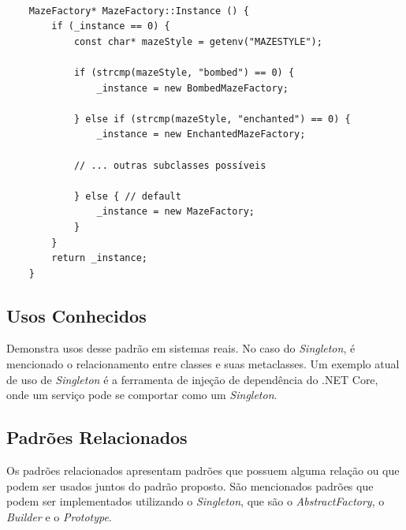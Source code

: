 \begin{lstlisting}[caption={Exemplo de \textit{Singleton} com subclasses.},label=singletonsub]
    
    MazeFactory* MazeFactory::Instance () {
        if (_instance == 0) {
            const char* mazeStyle = getenv("MAZESTYLE");

            if (strcmp(mazeStyle, "bombed") == 0) {
                _instance = new BombedMazeFactory;

            } else if (strcmp(mazeStyle, "enchanted") == 0) {
                _instance = new EnchantedMazeFactory;

            // ... outras subclasses possíveis

            } else { // default
                _instance = new MazeFactory;
            }
        }
        return _instance;
    } 

\end{lstlisting}


\subsection*{Usos Conhecidos}

Demonstra usos desse padrão em sistemas reais. No caso 
do \textit{Singleton}, é mencionado o relacionamento entre 
classes e suas metaclasses. Um exemplo atual de uso 
de \textit{Singleton} é a ferramenta de injeção de dependência 
do .NET Core, onde um serviço 
pode se comportar como um \textit{Singleton}\cite{didotnet}.

\subsection*{Padrões Relacionados}

Os padrões relacionados apresentam padrões que 
possuem alguma relação ou que podem ser usados juntos 
do padrão proposto. São mencionados padrões que 
podem ser implementados utilizando o \textit{Singleton}, que 
são o \textit{AbstractFactory}, o \textit{Builder} e o \textit{Prototype}.

